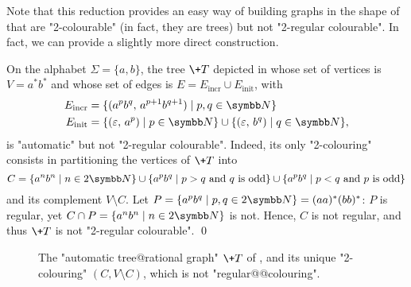 Note that this reduction provides an easy way of building
graphs in the shape of  that are "2-colourable" (in fact, they are trees) but not "2-regular colourable". In fact, we can provide a slightly more
direct construction.

\begin{example}
    \AP\label{ex:tree-not-2-reg-colourable}
    On the alphabet $\Sigma = \{a,b\}$, the tree $\+T$ depicted in  whose set of vertices is $V = a^*b^*$ and whose set 
    of edges is $E = E_{\mathrm{incr}} \cup E_{\mathrm{init}}$, with 
    \begin{align*}
        E_{\mathrm{incr}} & = \{(a^pb^q,\, a^{p+1}b^{q+1}) \mid p,q \in \N\} \\
        E_{\mathrm{init}} & = \{(\varepsilon,\, a^p) \mid p \in \N\} \cup \{(\varepsilon,\, b^q) \mid q \in \N\}, 
    \end{align*}    
    is "automatic" but not "2-regular colourable". 
    Indeed, its only "2-colouring"
    consists in partitioning the vertices of $\+T$ into
    \[
        C = \{a^n b^n \mid n \in 2\N\}
            \cup \{a^p b^q \mid p > q \text{ and $q$ is odd}\}
            \cup \{a^p b^q \mid p < q \text{ and $p$ is odd}\}
    \]
    and its complement $V \setminus C$.
    Let $P = \{a^p b^q \mid p, q \in 2\N\} = (aa)^*(bb)^*$:
    $P$ is regular, yet $C \cap P = \{a^n b^n \mid n \in 2\N\}$ is not.
    Hence, $C$ is not regular, and thus $\+T$ is not "2-regular colourable".
    \qed 
\end{example}

\begin{figure}[htb]
    \centering
    \begin{tikzpicture}
        
    \end{tikzpicture}
    \caption{
        \label{fig:tree-not-2reg-colour}
        The "automatic tree@rational graph" $\+T$ of ,
        and its unique "2-colouring" $(C, V\setminus C)$, which is not "regular@@colouring".
    }
\end{figure}